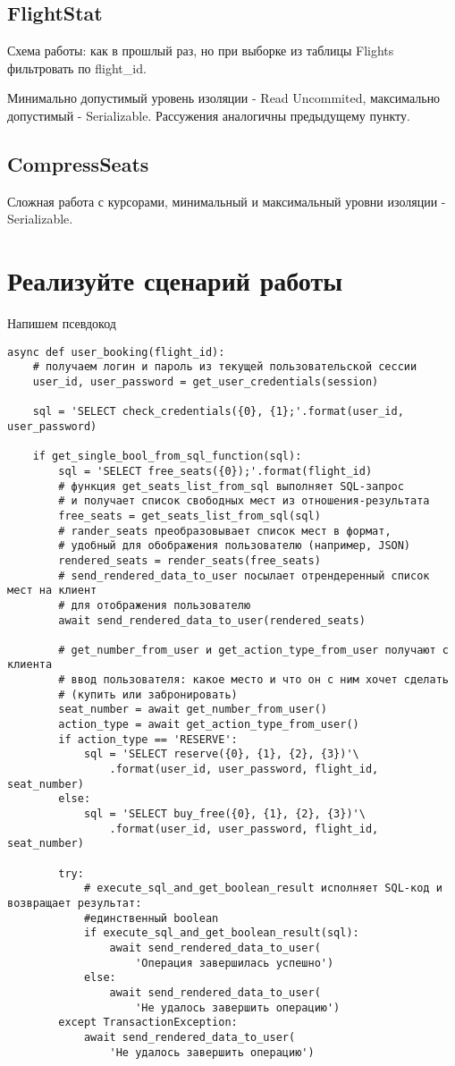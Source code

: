 \documentclass{article}
\begin{document}
\subsection{FlightStat}

Схема работы: как в прошлый раз, но при выборке из таблицы Flights фильтровать по flight\_id.

Минимально допустимый уровень изоляции - Read Uncommited, максимально допустимый - Serializable. Рассужения аналогичны предыдущему пункту.

\subsection{CompressSeats}

Сложная работа с курсорами, минимальный и максимальный уровни изоляции - Serializable.

\section{Реализуйте сценарий работы}

Напишем псевдокод

\begin{verbatim}
async def user_booking(flight_id):
	# получаем логин и пароль из текущей пользовательской сессии
	user_id, user_password = get_user_credentials(session)
	
	sql = 'SELECT check_credentials({0}, {1};'.format(user_id, user_password)
	
	if get_single_bool_from_sql_function(sql):
		sql = 'SELECT free_seats({0});'.format(flight_id)
		# функция get_seats_list_from_sql выполняет SQL-запрос
		# и получает список свободных мест из отношения-результата
		free_seats = get_seats_list_from_sql(sql)
		# rander_seats преобразовывает список мест в формат,
		# удобный для обображения пользователю (например, JSON)
		rendered_seats = render_seats(free_seats)
		# send_rendered_data_to_user посылает отрендеренный список мест на клиент
		# для отображения пользователю
		await send_rendered_data_to_user(rendered_seats)
		
		# get_number_from_user и get_action_type_from_user получают с клиента
		# ввод пользователя: какое место и что он с ним хочет сделать
		# (купить или забронировать)
		seat_number = await get_number_from_user()
		action_type = await get_action_type_from_user()
		if action_type == 'RESERVE':
			sql = 'SELECT reserve({0}, {1}, {2}, {3})'\
				.format(user_id, user_password, flight_id, seat_number)
		else:
			sql = 'SELECT buy_free({0}, {1}, {2}, {3})'\
				.format(user_id, user_password, flight_id, seat_number)
		
		try:
			# execute_sql_and_get_boolean_result исполняет SQL-код и возвращает результат:
			#единственный boolean
			if execute_sql_and_get_boolean_result(sql):
				await send_rendered_data_to_user(
					'Операция завершилась успешно')
			else:
				await send_rendered_data_to_user(
					'Не удалось завершить операцию')
		except TransactionException:
			await send_rendered_data_to_user(
				'Не удалось завершить операцию')
			
			

\end{verbatim}
\end{document}
